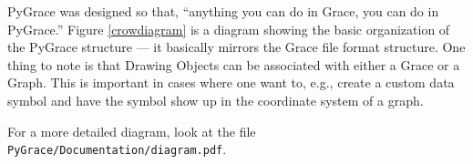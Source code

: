 PyGrace was designed so that, ``anything you can do in Grace, you can
do in PyGrace.''  Figure \ref{crowdiagram} is a diagram showing the
basic organization of the PyGrace structure --- it basically mirrors
the Grace file format structure.  One thing to note is that Drawing
Objects can be associated with either a Grace or a Graph.  This is
important in cases where one want to, e.g., create a custom data
symbol and have the symbol show up in the coordinate system of a
graph.

\noindent
For a more detailed diagram, look at the file {\tt
  PyGrace/Documentation/diagram.pdf}.
